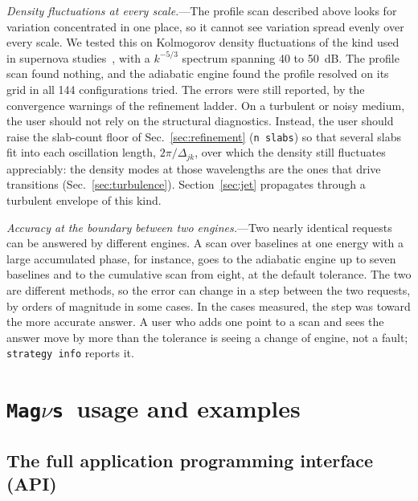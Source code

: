 \documentclass[final,5p,times,twocolumn,sort,compress]{elsarticle}
\makeatletter
\DeclareRobustCommand{\_}{%
  \ifmmode\nfss@text{\textunderscore}\else\textunderscore\allowbreak\fi}
\newcommand{\magnus}{{\tt Mag}\ensuremath{\nu}{\tt s}}
\makeatother
\begin{document}
\smallskip

\textit{Density fluctuations at every scale.}---The profile scan described above looks for variation concentrated in one place, so it cannot see variation spread evenly over every scale. We tested this on Kolmogorov density fluctuations of the kind used in supernova studies\ \cite{Loreti:1995ae, Patton:2013dba, Patton:2014lza}, with a $k^{-5/3}$ spectrum spanning 40 to 50~dB. The profile scan found nothing, and the adiabatic engine found the profile resolved on its grid in all 144 configurations tried. The errors were still reported, by the convergence warnings of the refinement ladder. On a turbulent or noisy medium, the user should not rely on the structural diagnostics. Instead, the user should raise the slab-count floor of Sec.~\ref{sec:refinement} ({\tt n\_slabs}) so that several slabs fit into each oscillation length, $2\pi/\Delta_{jk}$, over which the density still fluctuates appreciably: the density modes at those wavelengths are the ones that drive transitions (Sec.~\ref{sec:turbulence}). Section~\ref{sec:jet} propagates through a turbulent envelope of this kind.

\smallskip

\textit{Accuracy at the boundary between two engines.}---Two nearly identical requests can be answered by different engines. A scan over baselines at one energy with a large accumulated phase, for instance, goes to the adiabatic engine up to seven baselines and to the cumulative scan from eight, at the default tolerance. The two are different methods, so the error can change in a step between the two requests, by orders of magnitude in some cases. In the cases measured, the step was toward the more accurate answer. A user who adds one point to a scan and sees the answer move by more than the tolerance is seeing a change of engine, not a fault; {\tt strategy\_info} reports it.


\section{\magnus\ usage and examples}
\label{sec:examples}

\subsection{The full application programming interface (API)}
\label{sec:api}
\end{document}
